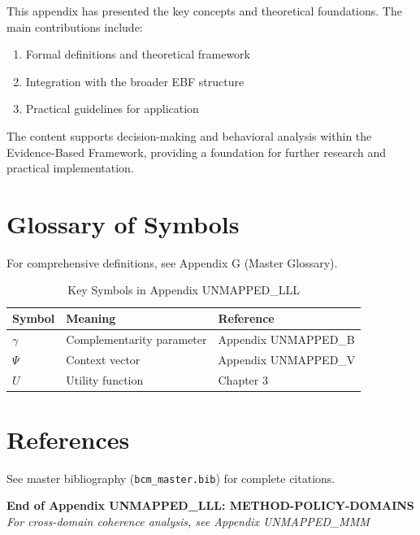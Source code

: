 This appendix has presented the key concepts and theoretical foundations.
The main contributions include:

\begin{enumerate}
    \item Formal definitions and theoretical framework
    \item Integration with the broader EBF structure
    \item Practical guidelines for application
\end{enumerate}

The content supports decision-making and behavioral analysis within the
Evidence-Based Framework, providing a foundation for further research
and practical implementation.


\section{Glossary of Symbols}
\label{sec:lll-glossary}

For comprehensive definitions, see Appendix G (Master Glossary).

\begin{table}[htbp]
\centering
\caption{Key Symbols in Appendix UNMAPPED_LLL}
\begin{tabular}{lll}
\toprule
\textbf{Symbol} & \textbf{Meaning} & \textbf{Reference} \\
\midrule
$\gamma$ & Complementarity parameter & Appendix UNMAPPED_B \\
$\Psi$ & Context vector & Appendix UNMAPPED_V \\
$U$ & Utility function & Chapter 3 \\
\bottomrule
\end{tabular}
\end{table}


\section{References}
\label{sec:references}

See master bibliography (\texttt{bcm\_master.bib}) for complete citations.

\nocite{bcm_master}


\vspace{2cm}
\begin{center}
{\large \textbf{End of Appendix UNMAPPED_LLL: METHOD-POLICY-DOMAINS}} \\
\vspace{0.5cm}
{\small \textit{For cross-domain coherence analysis, see Appendix UNMAPPED_MMM}}
\end{center}
